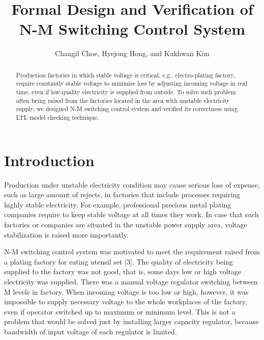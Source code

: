\documentclass[runningheads,a4paper]{llncs}
\begin{document}
\mainmatter  

\title{Formal Design and Verification of N-M Switching Control System}



\author{Changil Choe, Hyejong Hong, and Kukhwan Kim}






\maketitle


\begin{abstract}
Production factories in which stable voltage is critical, e.g., electro-plating factory, require constantly stable voltage to minimize loss by adjusting incoming voltage in real time, even if low-quality electricity is supplied from outside. To solve such problem often being raised from the factories located in the area with unstable electricity supply, we designed N-M switching control system and verified its correctness using LTL model checking technique.
\end{abstract}


\section{Introduction}
Production under unstable electricity condition may cause serious loss of expense, such as large amount of rejects, in factories that include processes requiring highly stable electricity. For example, professional precious metal plating companies require to keep stable voltage at all times they work. In case that such factories or companies are situated in the unstable power supply area, voltage stabilization is raised more importantly. 

N-M switching control system was motivated to meet the requirement raised from a plating factory for eating utensil set [3]. The quality of electricity being supplied to the factory was not good, that is, some days low or high voltage electricity was supplied. There was a manual voltage regulator switching between M levels in factory. When incoming voltage is too low or high, however, it was impossible to supply necessary voltage to the whole workplaces of the factory, even if operator switched up to maximum or minimum level. This is not a problem that would be solved just by installing larger capacity regulator, because bandwidth of input voltage of each regulator is limited.
\end{document}

